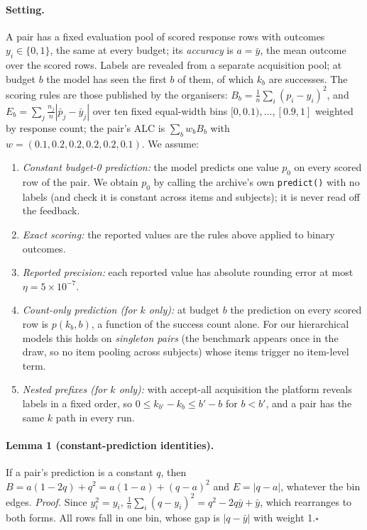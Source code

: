 \paragraph{Setting.}
A pair has a fixed evaluation pool of scored response rows with outcomes $y_i\in\{0,1\}$, the same at every budget;
its \emph{accuracy} is $a=\bar y$, the mean outcome over the scored rows. Labels are revealed from a separate
acquisition pool; at budget $b$ the model has seen the first $b$ of them, of which $k_b$ are successes. The scoring
rules are those published by the organisers: $B_b=\frac1n\sum_i(p_i-y_i)^2$, and $E_b=\sum_j\frac{n_j}{n}|\bar p_j-\bar
y_j|$ over ten fixed equal-width bins $[0,0.1),\dots,[0.9,1]$ weighted by response count; the pair's ALC is
$\sum_b w_bB_b$ with $w=(0.1,0.2,0.2,0.2,0.2,0.1)$. We assume:
\begin{enumerate}[label=A\arabic*.,leftmargin=2.2em,itemsep=0pt,topsep=2pt]
  \item \emph{Constant budget-0 prediction:} the model predicts one value $p_0$ on every scored row of the pair. We
    obtain $p_0$ by calling the archive's own \texttt{predict()} with no labels (and check it is constant across items
    and subjects); it is never read off the feedback.
  \item \emph{Exact scoring:} the reported values are the rules above applied to binary outcomes.
  \item \emph{Reported precision:} each reported value has absolute rounding error at most $\eta=5\times10^{-7}$.
  \item \emph{Count-only prediction (for $k$ only):} at budget $b$ the prediction on every scored row is $p(k_b,b)$,
    a function of the success count alone. For our hierarchical models this holds on \emph{singleton pairs} (the
    benchmark appears once in the draw, so no item pooling across subjects) whose items trigger no item-level term.
  \item \emph{Nested prefixes (for $k$ only):} with accept-all acquisition the platform reveals labels in a fixed
    order, so $0\le k_{b'}-k_b\le b'-b$ for $b<b'$, and a pair has the same $k$ path in every run.
\end{enumerate}

\paragraph{Lemma 1 (constant-prediction identities).}
If a pair's prediction is a constant $q$, then $B=a(1-2q)+q^2=a(1-a)+(q-a)^2$ and $E=|q-a|$, whatever the bin edges.
\textit{Proof.} Since $y_i^2=y_i$, $\frac1n\sum_i(q-y_i)^2=q^2-2q\bar y+\bar y$, which rearranges to both forms. All
rows fall in one bin, whose gap is $|q-\bar y|$ with weight 1.\hfill$\square$

